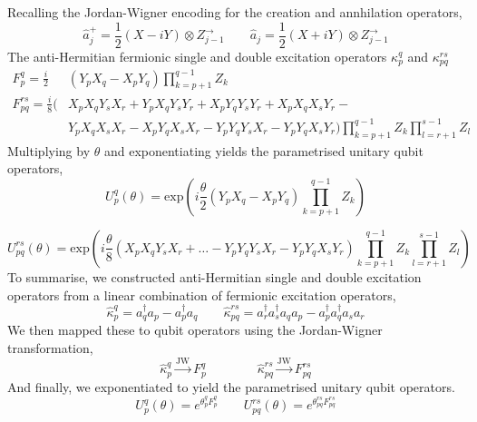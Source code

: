 Recalling the Jordan-Wigner encoding for the creation and annhilation operators,
\begin{equation*}
    \hat a_j^+ = \frac{1}{2} (X - iY) \otimes Z^\rightarrow_{j-1} \qquad
    \hat a_j = \frac{1}{2} (X + iY) \otimes Z^\rightarrow_{j-1}
\end{equation*}
The anti-Hermitian fermionic single and double excitation operators $\kappa_p^q$ and $\kappa_{pq}^{rs}$
\begin{align*}
    F_p^q = \frac{i}{2} & (Y_p X_q - X_p Y_q) \prod_{k=p+1}^{q-1} Z_k \\
    F_{pq}^{rs} = \frac{i}{8} (
      & X_p X_q Y_s X_r +
        Y_p X_q Y_s Y_r +
        X_p Y_q Y_s Y_r +
        X_p X_q X_s Y_r - \\
      & Y_p X_q X_s X_r -
        X_p Y_q X_s X_r -
        Y_p Y_q Y_s X_r -
        Y_p Y_q X_s Y_r )
    \prod_{k=p+1}^{q-1} Z_k
    \prod_{l=r+1}^{s-1} Z_l
\end{align*}
Multiplying by $\theta$ and exponentiating yields the parametrised unitary qubit operators,
\begin{equation*}
    U^q_p (\theta) =
    \text{exp} \left( i
    \frac{\theta}{2} (Y_p X_q - X_p Y_q) \prod_{k=p+1}^{q-1} Z_k \right)
\end{equation*}

\begin{equation*}
    U^{rs}_{pq} (\theta) = \text{exp} \left( i \frac{\theta}{8} (
    X_p X_q Y_s X_r
    + \dots -
    Y_p Y_q Y_s X_r -
    Y_p Y_q X_s Y_r )
    \prod_{k=p+1}^{q-1} Z_k
    \prod_{l=r+1}^{s-1} Z_l
    \right)
\end{equation*}
To summarise, we constructed anti-Hermitian single and double excitation operators from a linear combination of fermionic excitation operators,
\begin{equation*}
    \hat\kappa_p^q = a_q^\dagger a_p - a_p^\dagger a_q \qquad
    \hat\kappa_{pq}^{rs} =
    a_r^\dagger a_s^\dagger a_q a_p - a_p^\dagger a_q^\dagger a_s a_r
\end{equation*}\smallskip
We then mapped these to qubit operators using the Jordan-Wigner transformation,
\begin{equation*}
    \hat\kappa_p^q \xrightarrow{\text{JW}} F_p^q \qquad\qquad
    \hat\kappa_{pq}^{rs} \xrightarrow{\text{JW}} F_{pq}^{rs}
\end{equation*}
And finally, we exponentiated to yield the parametrised unitary qubit operators.
\begin{equation*}
    U^q_p (\theta) = e^{\theta^q_p F_p^q} \qquad
    U^{rs}_{pq}(\theta) = e^{\theta_{pq}^{rs} F_{pq}^{rs}}
\end{equation*}

